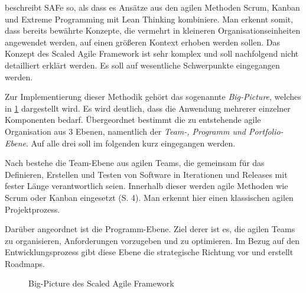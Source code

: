  beschreibt SAFe so, als dass es Ansätze aus den agilen Methoden Scrum, Kanban und Extreme Programming mit Lean Thinking kombiniere. Man erkennt somit, dass bereits bewährte  Konzepte, die vermehrt in kleineren Organisationseinheiten angewendet werden, auf einen größeren Kontext erhoben werden sollen. Das Konzept des Scaled Agile Framework ist sehr komplex und soll nachfolgend nicht detailliert erklärt werden. Es soll auf wesentliche Schwerpunkte eingegangen werden.
 

Zur Implementierung dieser Methodik gehört das sogenannte \textit{Big-Picture}, welches in \ref{fig:safe} dargestellt wird. Es wird deutlich, dass die Anwendung mehrerer einzelner Komponenten bedarf. Übergeordnet bestimmt die zu entstehende agile Organisation aus 3 Ebenen, namentlich der \textit{Team-, Programm und Portfolio-Ebene}. Auf alle drei soll im folgenden kurz eingegangen werden.

Nach  bestehe die Team-Ebene aus agilen Teams, die gemeinsam für das Definieren, Erstellen und Testen von Software in Iterationen und Releases mit fester Länge verantwortlich seien. Innerhalb dieser werden agile Methoden wie Scrum oder Kanban eingesetzt (S. 4). Man erkennt hier einen klassischen agilen Projektprozess.

Darüber angeordnet ist die Programm-Ebene. Ziel derer ist es, die agilen Teams zu organisieren, Anforderungen vorzugeben und zu optimieren. Im Bezug auf den Entwicklungsprozess gibt diese Ebene die strategische Richtung vor und erstellt Roadmaps. \cite[S. 5]{turetken_assessing_2017}

\begin{figure}[H]
	\centering
	\caption[Big-Picture des Scaled Agile Framework]{Big-Picture des Scaled Agile Framework \protect \cite[S. 4]{turetken_assessing_2017}}
	\label{fig:safe}
\end{figure}

